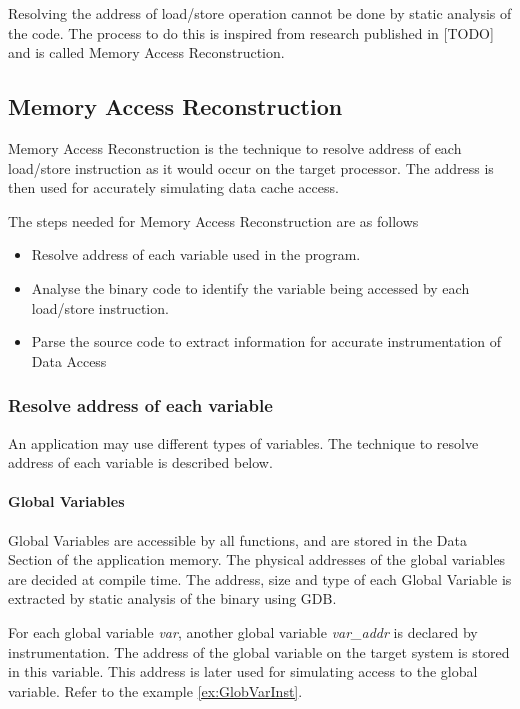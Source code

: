 Resolving the address of load/store operation cannot be done by static analysis of the code. The process to do this is inspired from research published in [TODO] and is called Memory Access Reconstruction. 

\subsection{Memory Access Reconstruction}
Memory Access Reconstruction is the technique to resolve address of each load/store instruction as it would occur on the target processor. The address is then used for accurately simulating data cache access. 

The steps needed for Memory Access Reconstruction are as follows

\begin{itemize} \itemsep -6pt
\item Resolve address of each variable used in the program.
\item Analyse the binary code to identify the variable being accessed by each load/store instruction.
\item Parse the source code to extract information for accurate instrumentation of Data Access
\end{itemize}

\subsubsection{Resolve address of each variable}
An application may use different types of variables. The technique to resolve address of each variable is described below. 

\paragraph{Global Variables}
Global Variables are accessible by all functions, and are stored in the Data Section of the application memory. The physical addresses of the global variables are decided at compile time. The address, size and type of each Global Variable is extracted by static analysis of the binary using GDB. 

For each global variable \emph{var}, another global variable \emph{var\_addr} is declared by instrumentation. The address of the global variable on the target system is stored in this variable. This address is later used for simulating access to the global variable. Refer to the example \ref{ex:GlobVarInst}.

